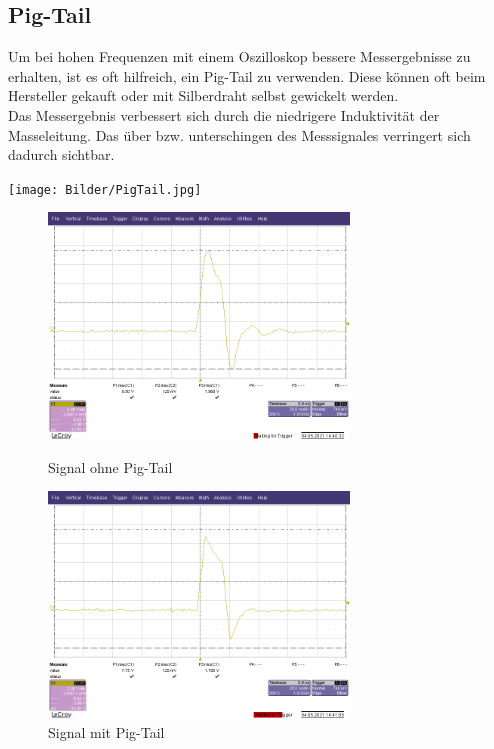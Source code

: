 \newpage
\subsection{Pig-Tail}
Um bei hohen Frequenzen mit einem Oszilloskop bessere Messergebnisse zu erhalten, ist es oft hilfreich, ein Pig-Tail zu verwenden. Diese können oft beim Hersteller gekauft oder mit Silberdraht selbst gewickelt werden. 
\\
Das Messergebnis verbessert sich durch die niedrigere Induktivität der Masseleitung. Das über bzw. unterschingen des Messsignales verringert sich dadurch sichtbar. 


\begin{center}

\texttt{[image: Bilder/PigTail.jpg]}


\end{center}


\begin{figure}[htb]
    \centering
    \begin{minipage}[t]{0.45\linewidth}
        \centering
        \includegraphics[width=8cm]{Bilder/TP19-ohne-PigTail.png}
        \caption{Signal ohne Pig-Tail}
    \end{minipage}%
    \hfill
    \begin{minipage}[t]{0.45\linewidth}
        \centering
        \includegraphics[width=8cm]{Bilder/TP19-mit-PigTail.png}
        \caption{Signal mit Pig-Tail}
    \end{minipage}
\end{figure}
